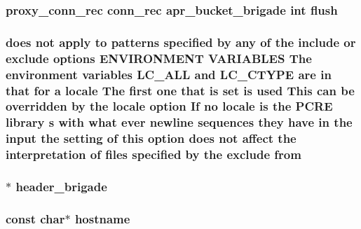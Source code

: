 \subsubsection[{\texorpdfstring{flush}{flush}}]{ {\bf proxy\+\_\+conn\+\_\+rec} {\bf conn\+\_\+rec} {\bf apr\+\_\+bucket\+\_\+brigade} {\bf int} flush}\hypertarget{group__MOD__PROXY_ga5e2c445a3d8cd8536a753d17dd40f4b6}{}\label{group__MOD__PROXY_ga5e2c445a3d8cd8536a753d17dd40f4b6}
\subsubsection[{\texorpdfstring{from}{from}}]{ does {\bf not} apply {\bf to} {\bf patterns} {\bf specified} by {\bf any} {\bf of} the {\bf include} {\bf or} {\bf exclude} {\bf options} E\+N\+V\+I\+R\+O\+N\+M\+E\+NT V\+A\+R\+I\+A\+B\+L\+ES The {\bf environment} {\bf variables} L\+C\+\_\+\+A\+LL and L\+C\+\_\+\+C\+T\+Y\+PE {\bf are} {\bf in} that for {\bf a} {\bf locale} The {\bf first} one that {\bf is} {\bf set} {\bf is} {\bf used} This {\bf can} {\bf be} overridden by the {\bf locale} {\bf option} If no {\bf locale} {\bf is} the {\bf P\+C\+RE} {\bf library} {\bf s} {\bf with} {\bf what} {\bf ever} {\bf newline} sequences they have {\bf in} the {\bf input} the {\bf setting} {\bf of} {\bf this} {\bf option} does {\bf not} affect the interpretation {\bf of} {\bf files} {\bf specified} by the {\bf exclude} from}\hypertarget{group__MOD__PROXY_ga900bb06a4314d99c8ad08d1ceffd114e}{}\label{group__MOD__PROXY_ga900bb06a4314d99c8ad08d1ceffd114e}
\subsubsection[{\texorpdfstring{header\+\_\+brigade}{header_brigade}}]{$\ast$ header\+\_\+brigade}\hypertarget{group__MOD__PROXY_ga685875bfd4f81a597447e253e20d0a4b}{}\label{group__MOD__PROXY_ga685875bfd4f81a597447e253e20d0a4b}
\subsubsection[{\texorpdfstring{hostname}{hostname}}]{ const char$\ast$ hostname}\hypertarget{group__MOD__PROXY_gaf5f02fc1c17e9b5b11fd66faaebd6405}{}\label{group__MOD__PROXY_gaf5f02fc1c17e9b5b11fd66faaebd6405}
